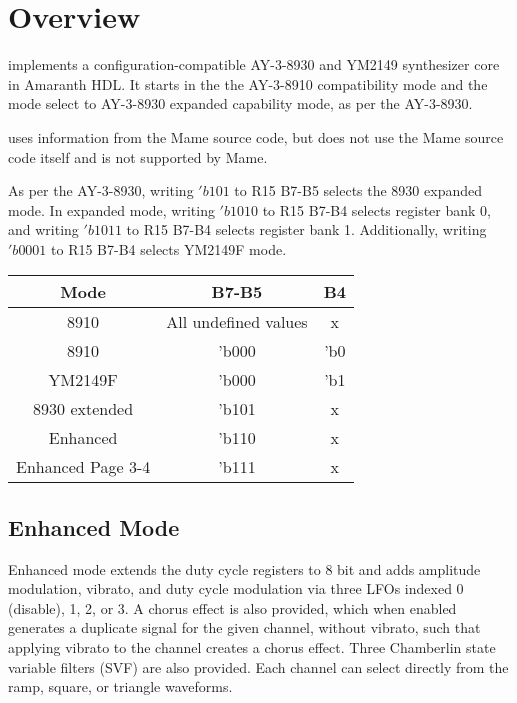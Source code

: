 
\chapter{Overview}

\projectname{ }implements a configuration-compatible AY-3-8930 \autocite{AY38930ds} and YM2149 \autocite{YM2149ds} synthesizer core in Amaranth HDL.  It starts in the the AY-3-8910 compatibility mode and the mode select to AY-3-8930 expanded capability mode, as per the AY-3-8930.

\projectname{ }uses information from the Mame source code, but does not use the Mame source code itself and is not supported by Mame.

As per the AY-3-8930, writing $'b101$ to R15 B7-B5 selects the 8930 expanded mode.  In expanded mode, writing $'b1010$ to R15 B7-B4 selects register bank 0, and writing $'b1011$ to R15 B7-B4 selects register bank 1.  Additionally, writing $'b0001$ to R15 B7-B4 selects YM2149F mode.

\begin{tabular}{|c|c|c|}
    \hline
    Mode & B7-B5 & B4 \\
    \hline
    8910 & All undefined values & x \\
    \hline
    8910 & 'b000 & 'b0 \\
    \hline
    YM2149F & 'b000 & 'b1 \\
    \hline
    8930 extended & 'b101 & x \\
    \hline
    Enhanced & 'b110 & x \\
    \hline
    Enhanced Page 3-4 & 'b111 & x \\
    \hline
\end{tabular}

\section{Enhanced Mode}

Enhanced mode extends the duty cycle registers to 8 bit and adds amplitude modulation, vibrato, and duty cycle modulation via three LFOs indexed 0 (disable), 1, 2, or 3.  A chorus effect is also provided, which when enabled generates a duplicate signal for the given channel, without vibrato, such that applying vibrato to the channel creates a chorus effect.  Three Chamberlin state variable filters (SVF) are also provided.  Each channel can select directly from the ramp, square, or triangle waveforms.

